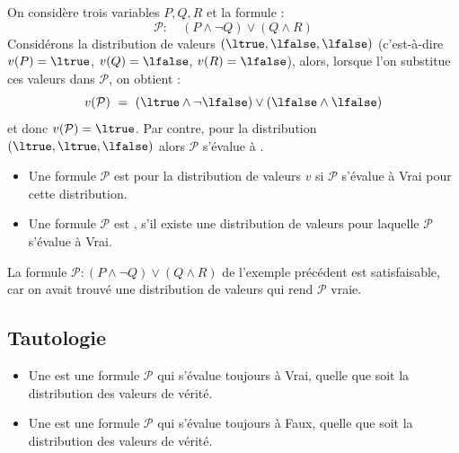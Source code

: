 \documentclass[11pt,class=report,crop=false]{standalone}
\begin{document}
\begin{exemple}
On considère trois variables $P, Q, R$ et la formule :
\[ \mathcal{P} : \quad (P \land \lnot Q) \lor (Q \land R) \]
Considérons la distribution de valeurs $(\ltrue, \lfalse, \lfalse)$ (c'est-à-dire $v(P) = \ltrue$, $v(Q)=\lfalse$, $v(R)=\lfalse$), alors, lorsque l'on substitue ces valeurs dans $\mathcal{P}$, on obtient :
\[ v(\mathcal{P}) \ = \  (\ltrue \land \lnot \lfalse) \lor (\lfalse \land \lfalse) \]
et donc $v(\mathcal{P}) = \ltrue$.
Par contre, pour la distribution $(\ltrue,\ltrue,\lfalse)$ alors $\mathcal{P}$ s'évalue à \lfalse.
\end{exemple}

\begin{definition}
	\sauteligne
	\begin{itemize}
		\item Une formule $\mathcal{P}$ est  pour la distribution de valeurs $v$ si $\mathcal{P}$ s'évalue à Vrai pour cette distribution. 
		
		\item Une formule $\mathcal{P}$ est , s'il existe une distribution de valeurs pour laquelle $\mathcal{P}$ s'évalue à Vrai.

	\end{itemize}	
\end{definition}


La formule $\mathcal{P} :  (P \land \lnot Q) \lor (Q \land R)$ de l'exemple précédent est satisfaisable, car on avait trouvé une distribution de valeurs qui rend $\mathcal{P}$ vraie. 


\subsection{Tautologie}

\begin{definition}
	\sauteligne
	\begin{itemize}
		\item Une  est une formule $\mathcal{P}$ qui s'évalue toujours à Vrai, quelle que soit la distribution des valeurs de vérité.
		
		\item Une  est une formule $\mathcal{P}$ qui s'évalue toujours à Faux, quelle que soit la distribution des valeurs de vérité.
	\end{itemize}
\end{definition}
\end{document}

